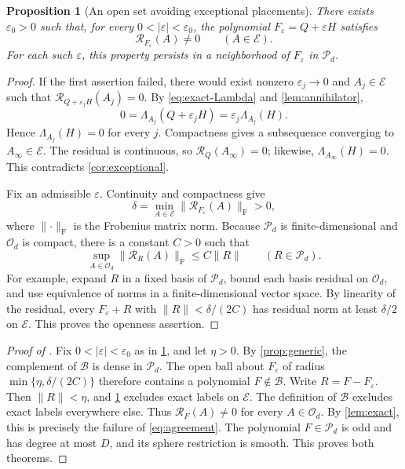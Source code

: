 \documentclass[11pt,reqno]{amsart}
\newtheorem{proposition}[proposition]{Proposition}
\theoremstyle{definition}
\theoremstyle{remark}
\numberwithin{equation}{section}
\newcommand{\eps}{\varepsilon}
\newcommand{\Orth}{\mathcal O_d}
\newcommand{\Pol}{\mathcal P_d}
\newcommand{\Exc}{\mathcal E}
\newcommand{\norm}[1]{\lVert #1\rVert}
\begin{document}
\begin{proposition}[An open set avoiding exceptional placements]
\label{prop:exceptional-open}
There exists $\eps_0>0$ such that, for every
$0<|\eps|<\eps_0$, the polynomial $F_\eps=Q+\eps H$ satisfies
\[
 \mathcal R_{F_\eps}(A)\ne0\qquad(A\in\Exc).
\]
For each such $\eps$, this property persists in a neighborhood of
$F_\eps$ in $\Pol$.
\end{proposition}
\begin{proof}
If the first assertion failed, there would exist nonzero
$\eps_j\to0$ and $A_j\in\Exc$ such that
$\mathcal R_{Q+\eps_jH}(A_j)=0$.
By \eqref{eq:exact-Lambda} and \cref{lem:annihilator},
\[
 0=\Lambda_{A_j}(Q+\eps_jH)
   =\eps_j\Lambda_{A_j}(H).
\]
Hence $\Lambda_{A_j}(H)=0$ for every $j$.
Compactness gives a subsequence converging to
$A_\infty\in\Exc$. The residual is continuous, so
$\mathcal R_Q(A_\infty)=0$; likewise,
$\Lambda_{A_\infty}(H)=0$. This contradicts
\cref{cor:exceptional}.

Fix an admissible $\eps$. Continuity and compactness give
\begin{equation}\label{eq:positive-gap}
 \delta=\min_{A\in\Exc}
             \norm{\mathcal R_{F_\eps}(A)}_{\mathrm F}>0,
\end{equation}
where $\norm{\cdot}_{\mathrm F}$ is the Frobenius matrix norm.
Because $\Pol$ is finite-dimensional and $\Orth$ is compact,
there is a constant $C>0$ such that
\begin{equation}\label{eq:uniform-bound}
 \sup_{A\in\Orth}\norm{\mathcal R_R(A)}_{\mathrm F}
                                  \leq C\norm R\qquad(R\in\Pol).
\end{equation}
For example, expand $R$ in a fixed basis of $\Pol$, bound each
basis residual on $\Orth$, and use equivalence of norms in a
finite-dimensional vector space. By linearity of the residual,
every $F_\eps+R$ with $\norm R<\delta/(2C)$ has residual norm
at least $\delta/2$ on $\Exc$. This proves the openness assertion.
\end{proof}

\begin{proof}[Proof of ]
Fix $0<|\eps|<\eps_0$ as in \cref{prop:exceptional-open}, and
let $\eta>0$. By \cref{prop:generic}, the complement of
$\mathcal B$ is dense in $\Pol$. The open ball about $F_\eps$
of radius $\min\{\eta,\delta/(2C)\}$ therefore contains a
polynomial $F\notin\mathcal B$. Write $R=F-F_\eps$.
Then $\norm R<\eta$, and \cref{prop:exceptional-open} excludes
exact labels on $\Exc$. The definition of $\mathcal B$ excludes
exact labels everywhere else. Thus
$\mathcal R_F(A)\ne0$ for every $A\in\Orth$.
By \cref{lem:exact}, this is precisely the failure of
\eqref{eq:agreement}. The polynomial $F\in\Pol$ is odd and
has degree at most $D$, and its sphere restriction is smooth.
This proves both theorems.
\end{proof}
\end{document}
